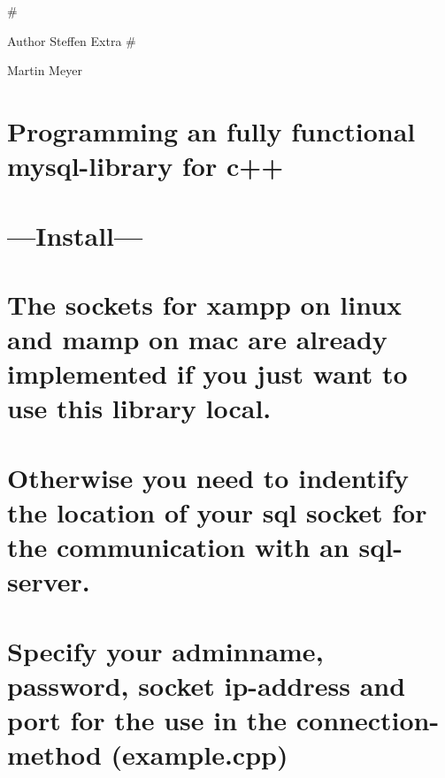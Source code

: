 \#\begin{DoxyAuthor}{Author}
Steffen Extra \#

Martin Meyer
\end{DoxyAuthor}
\section*{Programming an fully functional mysql-\/library for c++}

\section*{---Install---}

\section*{The sockets for xampp on linux and mamp on mac are already implemented if you just want to use this library local.}

\section*{Otherwise you need to indentify the location of your sql socket for the communication with an sql-\/server.}

\section*{Specify your adminname, password, socket ip-\/address and port for the use in the connection-\/method (example.\+cpp)}
